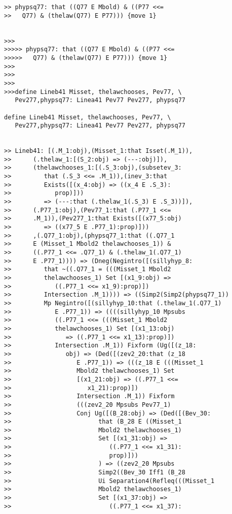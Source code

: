 \documentclass[12pt]{article}
\begin{document}
\begin{verbatim}
>> phypsq77: that ((Q77 E Mbold) & ((P77 <<=
>>   Q77) & (thelaw(Q77) E P77))) {move 1}


>>>
>>>>> phypsq77: that ((Q77 E Mbold) & ((P77 <<=
>>>>>   Q77) & (thelaw(Q77) E P77))) {move 1}
>>>
>>>
>>>
>>>define Lineb41 Misset, thelawchooses, Pev77, \
   Pev277,phypsq77: Linea41 Pev77 Pev277, phypsq77

define Lineb41 Misset, thelawchooses, Pev77, \
   Pev277,phypsq77: Linea41 Pev77 Pev277, phypsq77


>> Lineb41: [(.M_1:obj),(Misset_1:that Isset(.M_1)),
>>      (.thelaw_1:[(S_2:obj) => (---:obj)]),
>>      (thelawchooses_1:[(.S_3:obj),(subsetev_3:
>>         that (.S_3 <<= .M_1)),(inev_3:that
>>         Exists([(x_4:obj) => ((x_4 E .S_3):
>>            prop)]))
>>         => (---:that (.thelaw_1(.S_3) E .S_3))]),
>>      (.P77_1:obj),(Pev77_1:that (.P77_1 <<=
>>      .M_1)),(Pev277_1:that Exists([(x77_5:obj)
>>         => ((x77_5 E .P77_1):prop)]))
>>      ,(.Q77_1:obj),(phypsq77_1:that ((.Q77_1
>>      E (Misset_1 Mbold2 thelawchooses_1)) &
>>      ((.P77_1 <<= .Q77_1) & (.thelaw_1(.Q77_1)
>>      E .P77_1)))) => (Dneg(Negintro([(sillyhyp_8:
>>         that ~((.Q77_1 = (((Misset_1 Mbold2
>>         thelawchooses_1) Set [(x1_9:obj) =>
>>            ((.P77_1 <<= x1_9):prop)])
>>         Intersection .M_1)))) => ((Simp2(Simp2(phypsq77_1))
>>         Mp Negintro([(sillyhyp_10:that (.thelaw_1(.Q77_1)
>>            E .P77_1)) => ((((sillyhyp_10 Mpsubs
>>            ((.P77_1 <<= (((Misset_1 Mbold2
>>            thelawchooses_1) Set [(x1_13:obj)
>>               => ((.P77_1 <<= x1_13):prop)])
>>            Intersection .M_1)) Fixform (Ug([(z_18:
>>               obj) => (Ded([(zev2_20:that (z_18
>>                  E .P77_1)) => (((z_18 E (((Misset_1
>>                  Mbold2 thelawchooses_1) Set
>>                  [(x1_21:obj) => ((.P77_1 <<=
>>                     x1_21):prop)])
>>                  Intersection .M_1)) Fixform
>>                  (((zev2_20 Mpsubs Pev77_1)
>>                  Conj Ug([(B_28:obj) => (Ded([(Bev_30:
>>                        that (B_28 E ((Misset_1
>>                        Mbold2 thelawchooses_1)
>>                        Set [(x1_31:obj) =>
>>                           ((.P77_1 <<= x1_31):
>>                           prop)]))
>>                        ) => ((zev2_20 Mpsubs
>>                        Simp2((Bev_30 Iff1 (B_28
>>                        Ui Separation4(Refleq(((Misset_1
>>                        Mbold2 thelawchooses_1)
>>                        Set [(x1_37:obj) =>
>>                           ((.P77_1 <<= x1_37):

\end{verbatim}
\end{document}
